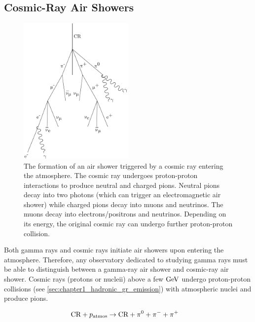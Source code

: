 \subsection{Cosmic-Ray Air Showers}
\begin{figure}
    \includegraphics[width=0.5\textwidth]{05_Astronomy/Images/air_shower/cosmic_ray.pdf}
    \caption{The formation of an air shower triggered by a cosmic ray entering the atmosphere. The cosmic ray undergoes proton-proton interactions to produce neutral and charged pions. Neutral pions decay into two photons (which can trigger an electromagnetic air shower) while charged pions decay into muons and neutrinos. The muons decay into electrons/positrons and neutrinos. Depending on its energy, the original cosmic ray can undergo further proton-proton collision.}
    \label{fig:chapter_2_air_shower_hadron}
\end{figure}
Both gamma rays and cosmic rays initiate air showers upon entering the atmosphere. Therefore, any observatory dedicated to studying gamma rays must be able to distinguish between a gamma-ray air shower and cosmic-ray air shower.
\newpar
Cosmic rays (protons or nucleii) above a few $\si{\giga\electronvolt}$ undergo proton-proton collisions (see \autoref{sec:chapter1_hadronic_gr_emission}) with atmospheric nuclei and produce pions.

\begin{equation}
    \begin{aligned}
    \text{CR} + p_\text{atmos} &\rightarrow \text{CR} + \pionneutral + \pionminus + \pionplus
    \end{aligned}
\end{equation}

